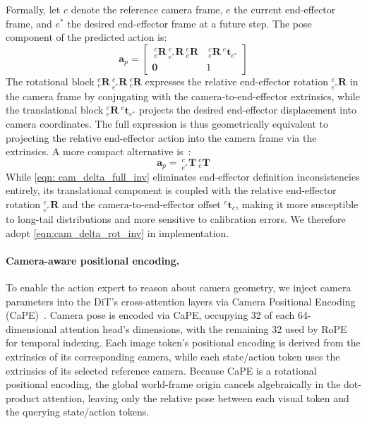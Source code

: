 Formally, let $c$ denote the reference camera frame, $e$ the current end-effector frame, and $e^*$ the desired end-effector frame at a future step.
The pose component of the predicted action is:
\begin{equation}
\label{eqn:cam_delta_rot_inv}
    \mathbf{a}_p = \begin{bmatrix}
        \ ^c _e \mathbf{R} \ ^e_{e^*} \mathbf{R} \ ^e _c \mathbf{R} & \ ^c_e \mathbf{R} \ ^e \mathbf{t}_{e^*} \\
        \mathbf{0} & 1
    \end{bmatrix}
\end{equation}
The rotational block ${}^c_e\mathbf{R}\ {}^e_{e^*}\mathbf{R}\ {}^e_c\mathbf{R}$ expresses the relative end-effector rotation ${}^e_{e^*}\mathbf{R}$ in the camera frame by conjugating with the camera-to-end-effector extrinsics, while the translational block ${}^c_e\mathbf{R}\ {}^e\mathbf{t}_{e^*}$ projects the desired end-effector displacement into camera coordinates. The full expression is thus geometrically equivalent to projecting the relative end-effector action into the camera frame via the extrinsics.
A more compact alternative is~\citep{zhang2026grounding}:
\begin{equation}
\label{eqn: cam_delta_full_inv}
    \mathbf{a}_p = \ ^c _{e^*} \mathbf{T} \ ^e _c \mathbf{T}
\end{equation}
While \cref{eqn: cam_delta_full_inv} eliminates end-effector definition inconsistencies entirely, its translational component is coupled with the relative end-effector rotation ${}^e_{e^*}\mathbf{R}$ and the camera-to-end-effector offset ${}^e\mathbf{t}_c$, making it more susceptible to long-tail distributions and more sensitive to calibration errors.
We therefore adopt \cref{eqn:cam_delta_rot_inv} in implementation.

\paragraph{Camera-aware positional encoding.}
To enable the action expert to reason about camera geometry, we inject camera parameters into the DiT's cross-attention layers via Camera Positional Encoding (CaPE)~\citep{kong2024eschernet}.
Camera pose is encoded via CaPE, occupying 32 of each 64-dimensional attention head's dimensions, with the remaining 32 used by RoPE~\citep{heo2024rotary} for temporal indexing.
Each image token's positional encoding is derived from the extrinsics of its corresponding camera, while each state/action token uses the extrinsics of its selected reference camera.
Because CaPE is a rotational positional encoding, the global world-frame origin cancels algebraically in the dot-product attention, leaving only the relative pose between each visual token and the querying state/action tokens.

